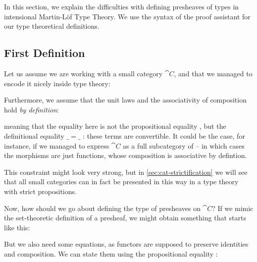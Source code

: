 In this section, we explain the difficulties with defining presheaves of types
in intensional Martin-Löf Type Theory. 
% 
We use the syntax of the \Agda proof assistant for our type theoretical 
definitions.

\subsection{First Definition}

Let us assume we are working with a small category \( \cat{C} \), and that we
managed to encode it nicely inside type theory:


Furthermore, we assume that the unit laws and the associativity of
composition hold \emph{by definition}:


% 
meaning that the equality here is not the propositional equality ,
but the definitional equality \( \_=\_\) : these terms are convertible. 
% 
It could be the case, for instance, if we managed to express \( \cat{C} \) as a 
full subcategory of  -- in which cases the morphisms are just 
functions, whose composition is associative by defintion.

This constraint might look very strong, but in \cref{sec:cat-strictification}
we will see that all small categories can in fact be presented in this way
in a type theory with strict propositions.

Now, how should we go about defining the type of presheaves on \( \cat{C} \)?
If we mimic the set-theoretic definition of a presheaf, we might obtain 
something that starts like this:


But we also need some equations, as functors are supposed to preserve
identities and composition.
% 
We can state them using the propositional equality : 

